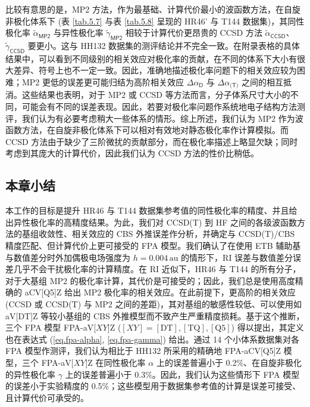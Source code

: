 比较有意思的是，MP2 方法，作为最基础、计算代价最小的波函数方法，在自旋非极化体系下 (表 \ref{tab.5.7} 与表 \ref{tab.5.8} 呈现的 HR46' 与 T144 数据集)，其同性极化率 $\tilde \alpha_\textsf{MP2}$ 与异性极化率 $\tilde \gamma_\textsf{MP2}$ 相较于计算代价更昂贵的 CCSD 方法 $\tilde \alpha_\textsf{CCSD}$、$\tilde \gamma_\textsf{CCSD}$ 要更小。这与 HH132 数据集的测评结论并不完全一致\cite{Hait-Head-Gordon.PCCP.2018}。在\alert{附录表格}的具体结果中，可以看到不同级别的相关效应对极化率的贡献，在不同的体系下大小有很大差异、符号上也不一定一致。因此，准确地描述极化率问题下的相关效应较为困难；MP2 更低的误差更可能归结为高阶相关效应 $\Delta \alpha_\textsf{D}$ 与 $\Delta \alpha_\textsf{(T)}$ 之间的相互抵消。这些结果也表明，对于 MP2 或 CCSD 等方法而言，分子体系尺寸大小的不同，可能会有不同的误差表现。因此，若要对极化率问题作系统地电子结构方法测评，我们认为有必要考虑稍大一些体系的情形。综上所述，我们认为 MP2 作为波函数方法，在自旋非极化体系下可以相对有效地对静态极化率作计算模拟。而 CCSD 方法由于缺少了三阶微扰的贡献部分，而在极化率描述上略显欠缺；同时考虑到其庞大的计算代价，因此我们认为 CCSD 方法的性价比稍低。

\subsection{本章小结}

本工作的目标是提升 HR46 与 T144 数据集参考值的同性极化率的精度、并且给出异性极化率的高精度结果。为此，我们对 CCSD(T) 到 HF 之间的各级波函数方法的基组收敛性、相关效应的 CBS 外推误差作分析，并确定与 CCSD(T)/CBS 精度匹配、但计算代价上更可接受的 FPA 模型。我们确认了在使用 ETB 辅助基与数值差分时外加偶极电场强度为 $h = 0.004 \, \text{au}$ 的情形下，RI 误差与数值差分误差几乎不会干扰极化率的计算精度。在 RI 近似下，HR46 与 T144 的所有分子，对于大基组 MP2 的极化率计算，其代价是可接受的；因此，我们总是使用高度精确的 aCV[Q5]Z 给出 MP2 极化率的相关效应。在此前提下，更高阶的相关效应 (CCSD 或 CCSD(T) 与 MP2 之间的差距)，其对基组的敏感性较低、可以使用如 aV[DT]Z 等较小基组的 CBS 外推模型而不致产生严重精度损耗。基于这个推断，三个 FPA 模型 FPA-aV[$XY$]Z ($[XY] = \mathrm{[DT], [TQ], [Q5]}$) 得以提出，其定义也在表达式 (\ref{eq.fpa-alpha}, \ref{eq.fpa-gamma}) 给出。通过 14 个小体系数据集对各 FPA 模型作测评，我们认为相比于 HH132 所采用的精确地 FPA-aCV[Q5]Z 模型，三个 FPA-aV[$XY$]Z 在同性极化率 $\alpha$ 上的误差普遍小于 0.2\%、在自旋非极化的异性极化率 $\gamma$ 上的误差普遍小于 0.3\%。因此，我们认为这些情形下 FPA 模型的误差小于实验精度的 0.5\%；这些模型用于数据集参考值的计算是误差可接受、且计算代价可承受的。

